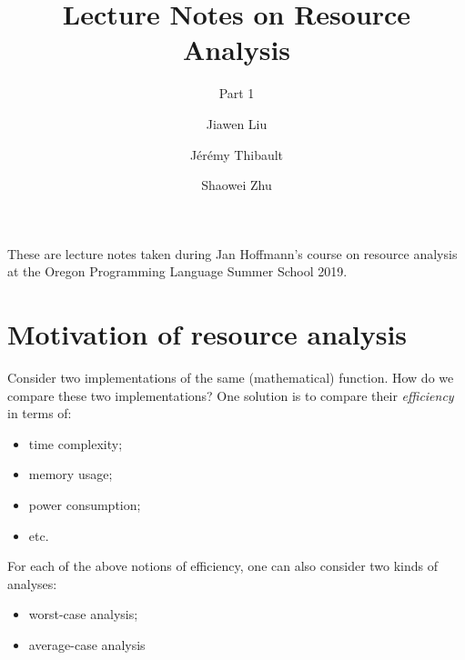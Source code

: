 \documentclass[ manuscript,screen, nonacm]{acmart}
\begin{document}
\author{Jiawen Liu}

\author{J\'er\'emy Thibault}

\author{Shaowei Zhu}

\title{Lecture Notes on Resource Analysis}
\subtitle{Part 1}

\maketitle

These are lecture notes taken during Jan Hoffmann's course on resource analysis at the Oregon
Programming Language Summer School 2019.

\section{Motivation of resource analysis}

Consider two implementations of the same (mathematical) function. 
How do we compare these two implementations? One solution is to compare their \emph{efficiency} in terms of:
\begin{itemize}
  \item time complexity;
  \item memory usage;
  \item power consumption;
  \item etc.
\end{itemize}

For each of the above notions of efficiency, one can also consider two kinds of analyses:
\begin{itemize}
    \item worst-case analysis;
    \item average-case analysis
\end{itemize}
\end{document}
